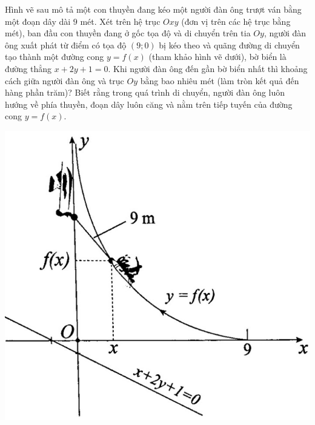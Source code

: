\begin{ex}%
	Hình vẽ sau mô tả một con thuyền đang kéo một người đàn ông trượt ván bằng một đoạn dây dài $9$ mét. Xét trên hệ trục $Oxy$ (đơn vị trên các hệ trục bằng mét), ban đầu con thuyền đang ở gốc tọa độ và di chuyển trên tia $Oy$, người đàn ông xuất phát từ điểm có tọa độ $(9;0)$ bị kéo theo và quãng đường di chuyển tạo thành một đường cong $y=f(x)$ (tham khảo hình vẽ dưới), bờ biển là đường thẳng $x+2y+1=0$. Khi người đàn ông đến gần bờ biển nhất thì khoảng cách giữa người đàn ông và trục $Oy$ bằng bao nhiêu mét (làm tròn kết quả đến hàng phần trăm)? Biết rằng trong quá trình di chuyển, người đàn ông luôn hướng về phía thuyền, đoạn dây luôn căng và nằm trên tiếp tuyến của đường cong $y=f(x)$.
	\begin{center}
		\includegraphics[scale=0.4]{images/de7-2}
	\end{center}
\end{ex}
